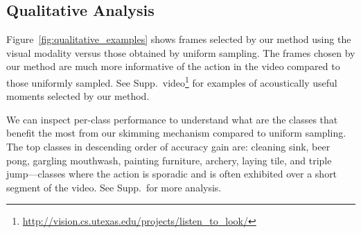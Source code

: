 \subsection{Qualitative Analysis}
Figure~\ref{fig:qualitative_examples} shows frames selected by our method using the visual modality versus those obtained by uniform sampling. The frames chosen by our method are much more informative of the action in the video compared to those  uniformly sampled. See Supp.~video\footnote{\scriptsize\label{project_page}\url{http://vision.cs.utexas.edu/projects/listen_to_look/}} for examples of acoustically useful moments selected by our method.

We can inspect per-class performance to understand what are the classes that benefit the most from our skimming mechanism compared to uniform sampling. The top classes in descending order of accuracy gain are: cleaning sink, beer pong, gargling mouthwash, painting furniture, archery, laying tile, and triple jump---classes where the action is sporadic and is often exhibited over a short segment of the video. See Supp.~for more analysis.